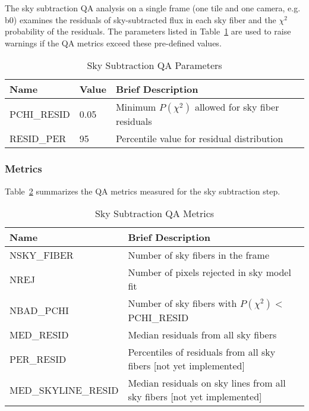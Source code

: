 \documentclass[12pt]{article}
\begin{document}
The sky subtraction QA analysis on a single 
frame (one tile and one camera, e.g. b0)
examines the residuals of sky-subtracted flux in each sky fiber 
and the $\chi^2$ probability of the residuals.
The parameters listed in Table~\ref{tab:sky_param}
are used to raise warnings if the QA metrics exceed 
these pre-defined values.

\begin{table}[h]
\begin{center}
\caption{Sky Subtraction QA Parameters}
\label{tab:sky_param}
\begin{tabular}{p{3.5cm}p{1.2cm}p{8.3cm}}
\hline
{\bf Name} & {\bf Value} & {\bf Brief Description}\\
\hline
PCHI\_RESID    & 0.05 & Minimum $P(\chi^2)$ allowed for sky fiber residuals \\ 
RESID\_PER     & 95   & Percentile value for residual distribution \\
\hline
\end{tabular}
\end{center}
\end{table}

\subsubsection{Metrics}

Table~\ref{tab:sky_metrics} summarizes the QA metrics measured
for the sky subtraction step.  

\begin{table}[h]
\begin{center}
\caption{Sky Subtraction QA Metrics}
\label{tab:sky_metrics}
\begin{tabular}{p{4.3cm}p{9.0cm}}
\hline
{\bf Name} & {\bf Brief Description}\\
\hline
NSKY\_FIBER           & Number of sky fibers in the frame \\
NREJ                  & Number of pixels rejected in sky model fit \\
NBAD\_PCHI            & Number of sky fibers with $P(\chi^2) < $PCHI\_RESID \\
MED\_RESID            & Median residuals from all sky fibers \\
PER\_RESID            & Percentiles of residuals from all sky fibers [not yet implemented] \\
MED\_SKYLINE\_RESID   & Median residuals on sky lines from all sky fibers [not yet implemented]\\
\hline
\end{tabular}
\end{center}
\end{table}
\end{document}
